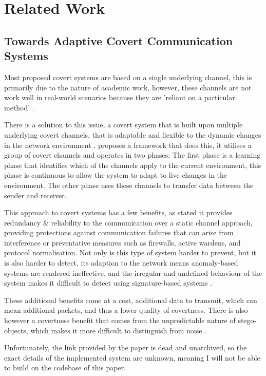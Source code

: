 \chapter{Related Work}
\label{ch:related_work}

\section{Towards Adaptive Covert Communication Systems}

Most proposed covert systems are based on a single underlying channel, this is primarily due to the nature of academic work, however, these channels are not work well in real-world scenarios because they are 'reliant on a particular method' \cite{TWACCS}.

There is a solution to this issue, a covert system that is built upon multiple underlying covert channels, that is adaptable and flexible to the dynamic changes in the network environment \cite{TWACCS}. \cite{TWACCS} proposes a framework that does this, it utilises a group of covert channels and operates in two phases; The first phase is a learning phase that identifies which of the channels apply to the current environment, this phase is continuous to allow the system to adapt to live changes in the environment. The other phase uses these channels to transfer data between the sender and receiver.

This approach to covert systems has a few benefits, as stated it provides redundancy \& reliability \cite{TWACCS} to the communication over a static channel approach, providing protections against communication failures that can arise from interference or preventative measures such as firewalls, active wardens, and protocol normalisation. Not only is this type of system harder to prevent, but it is also harder to detect, its adaption to the network means anomaly-based systems are rendered ineffective, and the irregular and undefined behaviour of the system makes it difficult to detect using signature-based systems \cite{TWACCS}.

These additional benefits come at a cost, additional data to transmit, which can mean additional packets, and thus a lower quality of covertness. There is also however a covertness benefit that comes from the unpredictable nature of stego-objects, which makes it more difficult to distinguish from noise \cite{ECopSSUOCC}.

Unfortunately, the link provided by the paper is dead and unarchived, so the exact details of the implemented system are unknown, meaning I will not be able to build on the codebase of this paper.

